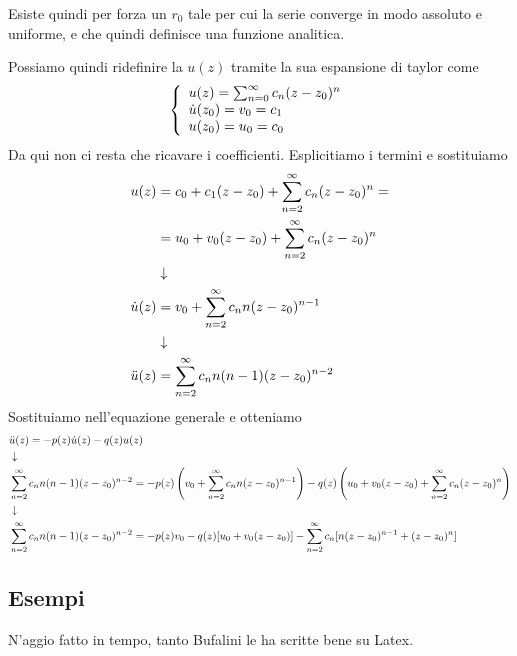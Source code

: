 Esiste quindi per forza un $r_0$ tale per cui la serie converge in modo assoluto e uniforme, e che quindi definisce una funzione analitica.

Possiamo quindi ridefinire la $u(z)$ tramite la sua espansione di taylor come
\begin{align}
	\triple{u(z) = \sum_{n=0}^{\infty} c_n(z-z_0)^n}{\dot{u}(z_0) = v_0 = c_1 \hfill}{u(z_0) = u_0 = c_0 \hfill}
\end{align}
Da qui non ci resta che ricavare i coefficienti. Esplicitiamo i termini e sostituiamo
\begin{align}
       u(z) &= c_0 + c_1 (z-z_0) + \sum_{n=2}^{\infty} c_n(z-z_0)^n = \nonumber \\
            &= u_0 + v_0 (z-z_0) + \sum_{n=2}^{\infty} c_n(z-z_0)^n \\ &\downarrow \nonumber \\
 \dot{u}(z) &= v_0 + \sum_{n=2}^{\infty} c_n n(z-z_0)^{n-1} \\ &\downarrow \nonumber \\
\ddot{u}(z) &= \sum_{n=2}^{\infty} c_n n(n-1)(z-z_0)^{n-2}
\end{align}
Sostituiamo nell'equazione generale e otteniamo
\begin{align}
	&\ddot{u}(z) = - p(z) \dot{u}(z) - q(z) u(z) \\ &\downarrow \nonumber \\
	&\sum_{n=2}^{\infty} c_n n(n-1)(z-z_0)^{n-2} = -p(z) \left(v_0 + \sum_{n=2}^{\infty} c_n n(z-z_0)^{n-1}\right) - q(z) \left( u_0 + v_0 (z-z_0) + \sum_{n=2}^{\infty} c_n(z-z_0)^n \right) \nonumber \\ &\downarrow \nonumber \\
	&\sum_{n=2}^{\infty} c_n n(n-1)(z-z_0)^{n-2} = -p(z)v_0 - q(z)[u_0 + v_0 (z-z_0) ] - \sum_{n=2}^{\infty} c_n [n(z-z_0)^{n-1} + (z-z_0)^n]
\end{align}


\newpage

\subsection{Esempi}
N'aggio fatto in tempo, tanto Bufalini le ha scritte bene su Latex.